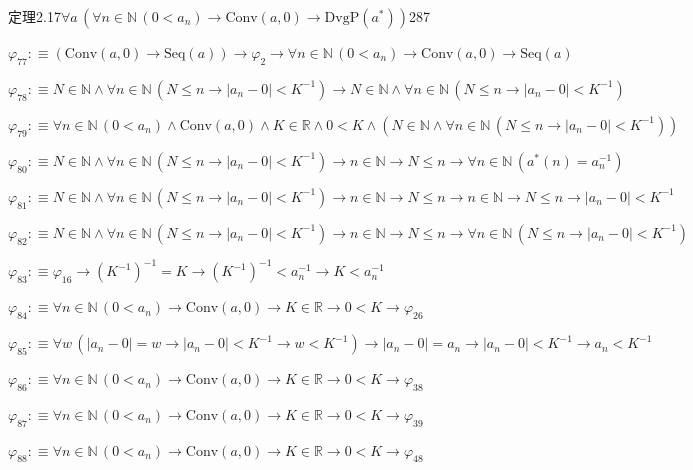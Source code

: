 \begin{fullproof}{定理2.17}{$\forall a\,(\forall n \in \mathbb{N}\,(0 < a_{n}) \to \mathrm{Conv}(a,0) \to \mathrm{DvgP}(a^{\ast}))$}{287}
\begin{abbrevlist}
\item $\varphi_{77} :\equiv (\mathrm{Conv}(a,0) \to \mathrm{Seq}(a)) \to \varphi_{2} \to \forall n \in \mathbb{N}\,(0 < a_{n}) \to \mathrm{Conv}(a,0) \to \mathrm{Seq}(a)$
\item $\varphi_{78} :\equiv N \in \mathbb{N} \land \forall n \in \mathbb{N}\,(N \leq n \to \lvert a_{n} - 0 \rvert < K^{-1}) \to N \in \mathbb{N} \land \forall n \in \mathbb{N}\,(N \leq n \to \lvert a_{n} - 0 \rvert < K^{-1})$
\item $\varphi_{79} :\equiv \forall n \in \mathbb{N}\,(0 < a_{n}) \land \mathrm{Conv}(a,0) \land K \in \mathbb{R} \land 0 < K \land (N \in \mathbb{N} \land \forall n \in \mathbb{N}\,(N \leq n \to \lvert a_{n} - 0 \rvert < K^{-1}))$
\item $\varphi_{80} :\equiv N \in \mathbb{N} \land \forall n \in \mathbb{N}\,(N \leq n \to \lvert a_{n} - 0 \rvert < K^{-1}) \to n \in \mathbb{N} \to N \leq n \to \forall n \in \mathbb{N}\,(a^{\ast}(n) = a_{n}^{-1})$
\item $\varphi_{81} :\equiv N \in \mathbb{N} \land \forall n \in \mathbb{N}\,(N \leq n \to \lvert a_{n} - 0 \rvert < K^{-1}) \to n \in \mathbb{N} \to N \leq n \to n \in \mathbb{N} \to N \leq n \to \lvert a_{n} - 0 \rvert < K^{-1}$
\item $\varphi_{82} :\equiv N \in \mathbb{N} \land \forall n \in \mathbb{N}\,(N \leq n \to \lvert a_{n} - 0 \rvert < K^{-1}) \to n \in \mathbb{N} \to N \leq n \to \forall n \in \mathbb{N}\,(N \leq n \to \lvert a_{n} - 0 \rvert < K^{-1})$
\item $\varphi_{83} :\equiv \varphi_{16} \to (K^{-1})^{-1} = K \to (K^{-1})^{-1} < a_{n}^{-1} \to K < a_{n}^{-1}$
\item $\varphi_{84} :\equiv \forall n \in \mathbb{N}\,(0 < a_{n}) \to \mathrm{Conv}(a,0) \to K \in \mathbb{R} \to 0 < K \to \varphi_{26}$
\item $\varphi_{85} :\equiv \forall w\,(\lvert a_{n} - 0 \rvert = w \to \lvert a_{n} - 0 \rvert < K^{-1} \to w < K^{-1}) \to \lvert a_{n} - 0 \rvert = a_{n} \to \lvert a_{n} - 0 \rvert < K^{-1} \to a_{n} < K^{-1}$
\item $\varphi_{86} :\equiv \forall n \in \mathbb{N}\,(0 < a_{n}) \to \mathrm{Conv}(a,0) \to K \in \mathbb{R} \to 0 < K \to \varphi_{38}$
\item $\varphi_{87} :\equiv \forall n \in \mathbb{N}\,(0 < a_{n}) \to \mathrm{Conv}(a,0) \to K \in \mathbb{R} \to 0 < K \to \varphi_{39}$
\item $\varphi_{88} :\equiv \forall n \in \mathbb{N}\,(0 < a_{n}) \to \mathrm{Conv}(a,0) \to K \in \mathbb{R} \to 0 < K \to \varphi_{48}$

\end{abbrevlist}
\end{fullproof}

